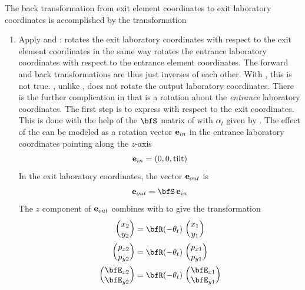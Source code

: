 The back transformation from exit element coordinates to exit
laboratory coordinates is accomplished by the transformation
  \begin{enumerate}
  \item
Apply  and :  rotates the exit
laboratory coordinates with respect to the exit element coordinates in
the same way  rotates the entrance laboratory coordinates
with respect to the entrance element coordinates. The forward and back
transformations are thus just inverses of each other.  With
, this is not true. , unlike , does
not rotate the output laboratory coordinates.  There is the further
complication in that  is a rotation about the {\em
entrance} laboratory coordinates. The first step is to express
 with respect to the exit coordinates. This is done with
the help of the $\bfS$ matrix of  with $\alpha_t$ given by
. The effect of the  can be modeled as a rotation
vector ${\bf e}_{in}$ in the entrance laboratory coordinates pointing
along the $z$-axis
\begin{equation}
 {\bf e}_{in} = (0, 0, \text{tilt})
\end{equation}
In the exit laboratory coordinates, the vector ${\bf e}_{out}$ is
\begin{equation}
  \Bf e_{out} = \bfS \, \Bf e_{in}
\end{equation}
The $z$ component of ${\bf e}_{out}$ combines with  to give
the transformation
\begin{align}
  \begin{pmatrix} x_2 \\ y_2 \end{pmatrix} &=
    \bfR (-\theta_{t}) \,   \begin{pmatrix} x_1 \\ y_1 \end{pmatrix} \CRNO
  \begin{pmatrix} p_{x2} \\ p_{y2} \end{pmatrix} &=
    \bfR (-\theta_{t}) \,   \begin{pmatrix} p_{x1} \\ p_{y1} \end{pmatrix} \\
  \begin{pmatrix} \bfE_{x2} \\ \bfE_{y2} \end{pmatrix} &=
    \bfR (-\theta_{t}) \,   \begin{pmatrix} \bfE_{x1} \\ \bfE_{y1} \end{pmatrix} \nonumber

\end{align}
\end{enumerate}
